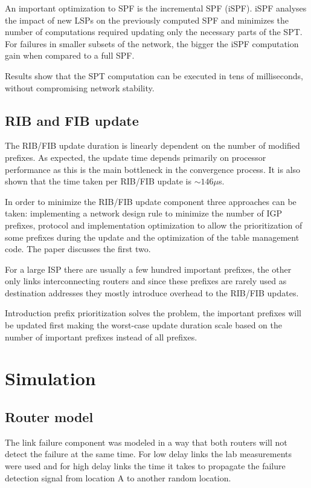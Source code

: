 \documentclass[a4paper, 11pt, UTF8]{article}
\begin{document}
An important optimization to SPF is the incremental SPF (iSPF).
iSPF analyses the impact of new LSPs on the previously computed SPF and minimizes the number of computations required updating only the necessary parts of the SPT.
For failures in smaller subsets of the network, the bigger the iSPF computation gain when compared to a full SPF.

Results show that the SPT computation can be executed in tens of milliseconds, without compromising network stability.

\subsection{RIB and FIB update}
The RIB/FIB update duration is linearly dependent on the number of modified prefixes.
As expected, the update time depends primarily on processor performance as this is the main bottleneck in the convergence process.
It is also shown that the time taken per RIB/FIB update is $\sim146\mu$s.

In order to minimize the RIB/FIB update component three approaches can be taken: 
implementing a network design rule to minimize the number of IGP prefixes, protocol and implementation optimization to allow the prioritization of some prefixes during the update and the optimization of the table management code.
The paper discusses the first two.

For a large ISP there are usually a few hundred important prefixes, the other only links interconnecting routers and since these prefixes are rarely used as destination addresses they mostly introduce overhead to the RIB/FIB updates.

Introduction prefix prioritization solves the problem, the important prefixes will be updated first making
the worst-case update duration scale based on the number of important prefixes instead of all prefixes.

\section{Simulation}
\subsection{Router model}
The link failure component was modeled in a way that both routers will not detect the failure at the same time.
For low delay links the lab measurements were used and for high delay links the time it takes to propagate the failure detection signal from location A to another random location. %
\end{document}
